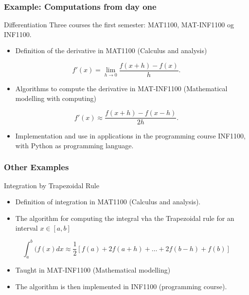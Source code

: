 \documentclass{beamer}
\begin{document}
\begin{frame}
\frametitle{Example: Computations from day one}

\begin{block}{Differentiation }
Three courses the first semester:  MAT1100, MAT-INF1100 og INF1100.
\begin{itemize}
\item Definition  of the derivative in  MAT1100 (Calculus and analysis) 
\end{itemize}

\noindent
\[
 f'(x)=\lim_{h \rightarrow 0}\frac{f(x+h)-f(x)}{h}.
\]
\begin{itemize}
\item Algorithms to compute the derivative in MAT-INF1100  (Mathematical modelling with computing)
\end{itemize}

\noindent
\[
 f'(x)\approx \frac{f(x+h)-f(x-h)}{2h}.
\]
\begin{itemize}
\item Implementation and use in applications in  the programming course INF1100, with Python as programming language. 
\end{itemize}

\noindent
\end{block}
\end{frame}

\begin{frame}
\frametitle{Other Examples}

\begin{block}{Integration by Trapezoidal Rule  }

\begin{itemize}
\item Definition of integration  in MAT1100 (Calculus and analysis).

\item The algorithm for computing the  integral vha the Trapezoidal rule for an interval $x \in [a,b]$
\end{itemize}

\noindent
\[
  \int_a^b(f(x) dx \approx \frac{1}{2}\left [f(a)+2f(a+h)+\dots+2f(b-h)+f(b)\right] 
\]
\begin{itemize}
\item Taught   in MAT-INF1100  (Mathematical modelling)

\item The algorithm is then implemented in  INF1100 (programming course).
\end{itemize}

\noindent
\end{block}
\end{frame}
\end{document}
